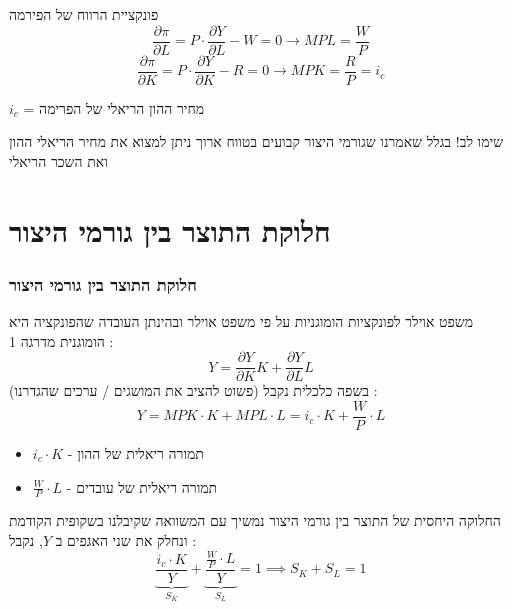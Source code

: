 \documentclass[usenames,dvipsnames,10pt]{beamer}
\begin{document}
\begin{RTL}
\begin{frame}[allowframebreaks]
\begin{block}{פונקציית הרווח של הפירמה}
            $$\frac{\partial \pi}{\partial L } = P \cdot \frac{\partial Y}{\partial L} - W = 0 \to MPL = \frac{W}{P}$$
            $$\frac{\partial \pi}{\partial K} = P \cdot \frac{\partial Y}{\partial K} - R = 0 \to MPK = \frac{R}{P} = i_c$$

            $i_c$ = מחיר ההון הריאלי של הפרימה
        \end{block}

        \framebreak

        \begin{alertblock}{שימו לב!}
            בגלל שאמרנו שגורמי היצור קבועים בטווח ארוך ניתן למצוא את מחיר הריאלי ההון ואת השכר הריאלי
        \end{alertblock}
        
    
    \end{frame}

    \section{חלוקת התוצר בין גורמי היצור}
    \begin{frame}[allowframebreaks]
        \frametitle{חלוקת התוצר בין גורמי היצור}
        \begin{block}{משפט אוילר לפונקציות הומוגניות}
            על פי משפט אוילר ובהינתן העובדה שהפונקציה היא הומוגנית מדרגה 1 :
            \begin{equation*}
                Y  = \frac{\partial Y}{\partial K} K + \frac{\partial Y}{\partial L} L
            \end{equation*} 
            בשפה כלכלית נקבל (פשוט להציב את המושגים / ערכים שהגדרנו) : 
            \begin{equation*}
                Y = MPK \cdot  K + MPL \cdot  L = i_c \cdot K + \frac{W}{P} \cdot L
            \end{equation*}
            \begin{itemize}
                \item $i_c \cdot K$ - תמורה ריאלית של ההון
                \item $\frac{W}{P} \cdot L$ - תמורה ריאלית של עובדים
            \end{itemize}
        \end{block}
        

        \framebreak
        \begin{block}{החלוקה היחסית של התוצר בין גורמי היצור}
            נמשיך עם המשוואה שקיבלנו בשקופית הקודמת ונחלק את שני האגפים ב $Y$, נקבל : 
            \begin{equation*}
               \underbrace{ \frac{i_c \cdot K}{Y}}_{S_K} + \underbrace{\frac{\frac{W}{P} \cdot L}{Y}}_{S_L} = 1 \implies S_K + S_L = 1 
            \end{equation*}


\end{block}
\end{frame}
\end{RTL}
\end{document}
